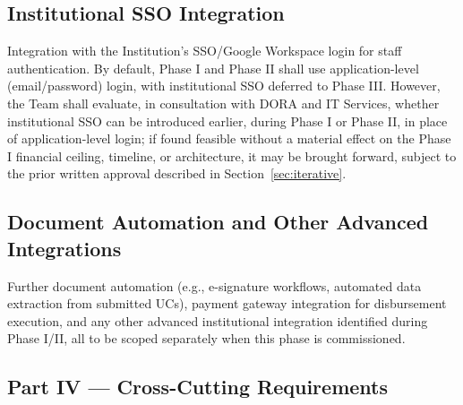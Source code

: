 \documentclass[11pt]{article}
\begin{document}
\subsection{Institutional SSO Integration}
\label{sec:sso}
Integration with the Institution's SSO/Google Workspace login for staff authentication. By default, Phase I and Phase II shall use application-level (email/password) login, with institutional SSO deferred to Phase III. However, the Team shall evaluate, in consultation with DORA and IT Services, whether institutional SSO can be introduced earlier, during Phase I or Phase II, in place of application-level login; if found feasible without a material effect on the Phase I financial ceiling, timeline, or architecture, it may be brought forward, subject to the prior written approval described in Section~\ref{sec:iterative}.

\subsection{Document Automation and Other Advanced Integrations}
Further document automation (e.g., e-signature workflows, automated data extraction from submitted UCs), payment gateway integration for disbursement execution, and any other advanced institutional integration identified during Phase I/II, all to be scoped separately when this phase is commissioned.

\subsection*{Part IV --- Cross-Cutting Requirements}
\end{document}
